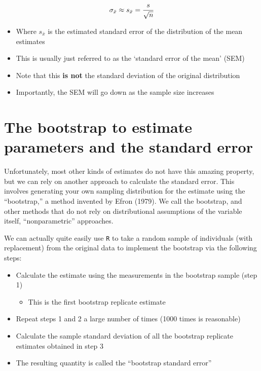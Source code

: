 \documentclass[]{book}
\providecommand{\tightlist}{%
  \setlength{\itemsep}{0pt}\setlength{\parskip}{0pt}}
\begin{document}
\[\huge \sigma_{\bar{x}} \approx s_{\bar{x}} = \frac{s}{\sqrt{n}} \]

\begin{itemize}
\tightlist
\item
  Where \(s_{\bar{x}}\) is the estimated standard error of the distribution of the mean estimates
\item
  This is usually just referred to as the `standard error of the mean' (SEM)
\item
  Note that this \textbf{is not} the standard deviation of the original distribution
\item
  Importantly, the SEM will go down as the sample size increases
\end{itemize}

\hypertarget{the-bootstrap-to-estimate-parameters-and-the-standard-error}{%
\section{The bootstrap to estimate parameters and the standard error}\label{the-bootstrap-to-estimate-parameters-and-the-standard-error}}

Unfortunately, most other kinds of estimates do not have this amazing property, but we can rely on another approach to calculate the standard error. This involves generating your own sampling distribution for the estimate using the ``bootstrap,'' a method invented by Efron (1979). We call the bootstrap, and other methods that do not rely on distributional assumptions of the variable itself, ``nonparametric'' approaches.

We can actually quite easily use \texttt{R} to take a random sample of individuals (with replacement) from the original data to implement the bootstrap via the following steps:

\begin{itemize}
\tightlist
\item
  Calculate the estimate using the measurements in the bootstrap sample (step 1)

  \begin{itemize}
  \tightlist
  \item
    This is the first bootstrap replicate estimate
  \end{itemize}
\item
  Repeat steps 1 and 2 a large number of times (1000 times is reasonable)
\item
  Calculate the sample standard deviation of all the bootstrap replicate estimates obtained in step 3
\item
  The resulting quantity is called the ``bootstrap standard error''
\end{itemize}
\end{document}
